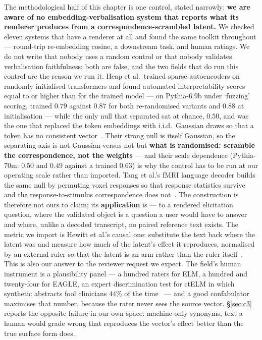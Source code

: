 \documentclass[11pt]{article}
\begin{document}
\begin{sloppypar}
The methodological half of this chapter is one control, stated narrowly: \textbf{we are aware of no
embedding-verbalisation system that reports what its renderer produces from a
correspondence-scrambled latent.} We checked eleven systems that have a renderer at all and found
the same toolkit throughout --- round-trip re-embedding cosine, a downstream task, and human
ratings. We do not write that nobody uses a random control or that nobody validates verbalisation
faithfulness; both are false, and the two fields that do run this control are the reason we run it.
Heap et al.\ trained sparse autoencoders on randomly initialised transformers and found automated
interpretability scores equal to or higher than for the trained model --- on Pythia-6.9b under
`fuzzing' scoring, trained $0.79$ against $0.87$ for both re-randomised variants and $0.88$ at
initialisation --- while the only null that separated sat at chance, $0.50$, and was the one that
replaced the token embeddings with i.i.d.\ Gaussian draws so that a token has no consistent
vector~\cite{heap2026autointerp}. Their strong null is itself Gaussian, so the separating axis is
not Gaussian-versus-not but \textbf{what is randomised: scramble the correspondence, not the
weights} --- and their scale dependence (Pythia-70m: $0.50$ and $0.49$ against a trained $0.63$) is
why the control has to be run at our operating scale rather than imported. Tang et al.'s fMRI
language decoder builds the same null by permuting voxel responses so that response statistics
survive and the response-to-stimulus correspondence does not~\cite{tang2023semantic}. The
construction is therefore not ours to claim; its \textbf{application} is --- to a rendered
elicitation question, where the validated object is a question a user would have to answer and where,
unlike a decoded transcript, no paired reference text exists. The metric we import is Hewitt et al.'s
causal one: substitute the text back where the latent was and measure how much of the latent's effect
it reproduces, normalised by an external ruler so that the latent is an arm rather than the ruler
itself~\cite{hewitt2025neologism}. This is also our answer to the reviewer request we expect. The
field's human instrument is a plausibility panel --- a hundred raters for ELM, a hundred and
twenty-four for EAGLE, an expert discrimination test for ctELM in which synthetic abstracts fool
clinicians $44\%$ of the time~\cite{ondov2026ctelm} --- and a good confabulator maximises that number,
because the rater never sees the source vector. \S\ref{sec:c3} reports the opposite failure in our own
space: machine-only synonyms, text a human would grade wrong that reproduces the vector's effect
better than the true surface form does.
\end{sloppypar}
\end{document}
